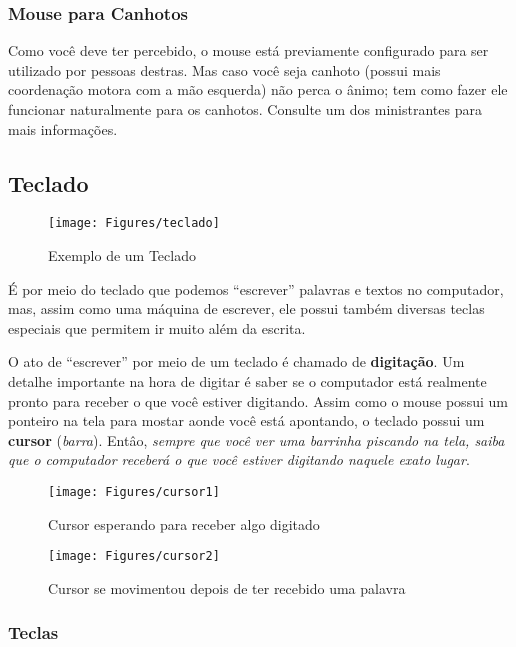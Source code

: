 \documentclass[hidelinks,12pt]{article}
\begin{document}
\subsubsection{Mouse para Canhotos}

Como você deve ter percebido, o mouse está previamente configurado para ser utilizado por pessoas destras. Mas caso você seja canhoto (possui mais coordenação motora com a mão esquerda) não perca o ânimo; tem como fazer ele funcionar naturalmente para os canhotos. Consulte um dos ministrantes para mais informações.

\subsection{Teclado}
\label{Teclado}


\begin{figure}[!h]
        \centering
		\texttt{[image: Figures/teclado]}
		\label{fig:teclado}
		\caption{Exemplo de um Teclado}
\end{figure}

É por meio do teclado que podemos ``escrever'' palavras e textos no computador, mas, assim como uma máquina de escrever, ele possui também diversas teclas especiais que permitem ir muito além da escrita. 

O ato de ``escrever'' por meio de um teclado é chamado de \textbf{digitação}. Um detalhe importante na hora de digitar é saber se o computador está realmente pronto para receber o que você estiver digitando. Assim como o mouse possui um ponteiro na tela para mostar aonde você está apontando, o teclado possui um \textbf{cursor} (\emph{barra}). Entâo, \emph{sempre que você ver uma barrinha piscando na tela, saiba que o computador receberá o que você estiver digitando naquele exato lugar}.

\begin{figure}[!h]
        \centering
		\texttt{[image: Figures/cursor1]}
		\label{fig:cursor1}
		\caption{Cursor esperando para receber algo digitado}
\end{figure}

\begin{figure}[!h]
        \centering
		\texttt{[image: Figures/cursor2]}
		\label{fig:cursor2}
		\caption{Cursor se movimentou depois de ter recebido uma palavra}
\end{figure}


\subsubsection{Teclas}
\end{document}
